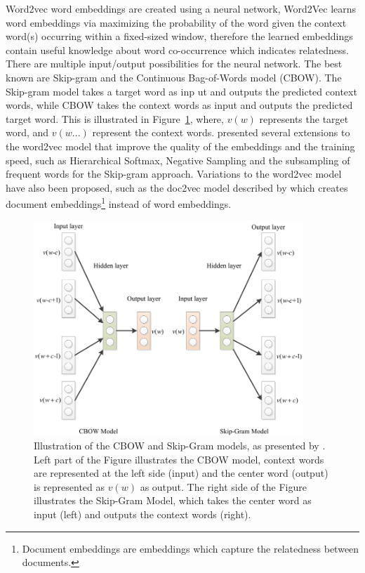 \documentclass[../../Thesis.tex]{subfiles}
\begin{document}
\begin{jumpin}
Word2vec word embeddings are created using a neural network, Word2Vec learns word embeddings via maximizing the probability of the word given the context word(s) occurring within a fixed-sized window, therefore the learned embeddings contain useful knowledge about word co-occurrence\cite{nalisnick2016improving} which indicates relatedness\cite{lai2016generate}. There are multiple input/output possibilities for the neural network. The best known are Skip-gram and the Continuous Bag-of-Words model (CBOW). The Skip-gram model takes a target word as inp ut and outputs the predicted context words, while CBOW takes the context words as input and outputs the predicted target word\cite{nalisnick2016improving, pennington2014glove}. This is illustrated in Figure~\ref{figure:word2vecModels}, where, $v(w)$ represents the target word, and $v(w...)$ represent the context words. \citet{mikolov2013distributed}\cite{mikolov2013efficient} presented several extensions to the word2vec model that improve the quality of the embeddings and the training speed, such as Hierarchical Softmax, Negative Sampling and the subsampling of frequent words for the Skip-gram approach. Variations to the word2vec model have also been proposed, such as the doc2vec model described by \citet{lau2016empirical} which creates document embeddings\footnote{Document embeddings are embeddings which capture the relatedness between documents.} instead of word embeddings.
\begin{figure}[hbt]
\begin{center}
\includegraphics[width=4in]{Plots/Model-Architecture-of-CBOW-and-Skip-Gram.png}
\caption{Illustration of the CBOW and Skip-Gram models, as presented by \citet{chen2017convolutional}. Left part of the Figure illustrates the CBOW model, context words are represented at the left side (input) and the center word (output) is represented as $v(w)$ as output. The right side of the Figure illustrates the Skip-Gram Model, which takes the center word as input (left) and outputs the context words (right).}\label{figure:word2vecModels}

\end{center}
\end{figure}
\end{jumpin}
\end{document}

